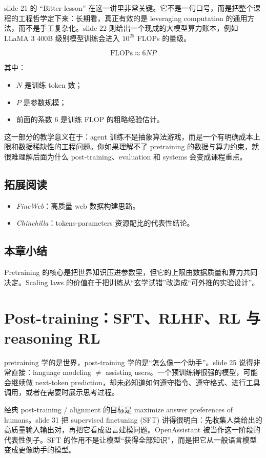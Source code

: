 \documentclass[a4paper]{article}
\begin{document}
slide 21 的 ``Bitter lesson'' 在这一讲里非常关键。它不是一句口号，而是把整个课程的工程哲学定下来：长期看，真正有效的是 leveraging computation 的通用方法，而不是手工复杂化。slide 22 则给出一个现成的大模型算力账本，例如 LLaMA 3 400B 级别模型训练会进入 \(10^{25}\) FLOPs 的量级。

\[
\mathrm{FLOPs} \approx 6NP
\]

其中：
\begin{itemize}
    \item \(N\) 是训练 token 数；
    \item \(P\) 是参数规模；
    \item 前面的系数 6 是训练 FLOP 的粗略经验估计。
\end{itemize}

这一部分的教学意义在于：agent 训练不是抽象算法游戏，而是一个有明确成本上限和数据稀缺性的工程问题。你如果理解不了 pretraining 的数据与算力约束，就很难理解后面为什么 post-training、evaluation 和 systems 会变成课程重点。

\subsection{拓展阅读}
\begin{itemize}
    \item \emph{FineWeb}：高质量 web 数据构建思路。
    \item \emph{Chinchilla}：tokens-parameters 资源配比的代表性结论。
\end{itemize}

\subsection{本章小结}
Pretraining 的核心是把世界知识压进参数里，但它的上限由数据质量和算力共同决定。Scaling laws 的价值在于把训练从“玄学试错”改造成“可外推的实验设计”。

\section{Post-training：SFT、RLHF、RL 与 reasoning RL}
pretraining 学的是世界，post-training 学的是“怎么像一个助手”。slide 25 说得非常直接：language modeling \(\neq\) assisting users。一个预训练得很强的模型，可能会继续做 next-token prediction，却未必知道如何遵守指令、遵守格式、进行工具调用，或者在需要时展示思考过程。

经典 post-training / alignment 的目标是 maximize answer preferences of humans。slide 31 把 supervised finetuning (SFT) 讲得很明白：先收集人类给出的高质量输入输出对，再把它看成语言建模问题。OpenAssistant 被当作这一阶段的代表性例子。SFT 的作用不是让模型“获得全部知识”，而是把它从一般语言模型变成更像助手的模型。
\end{document}

